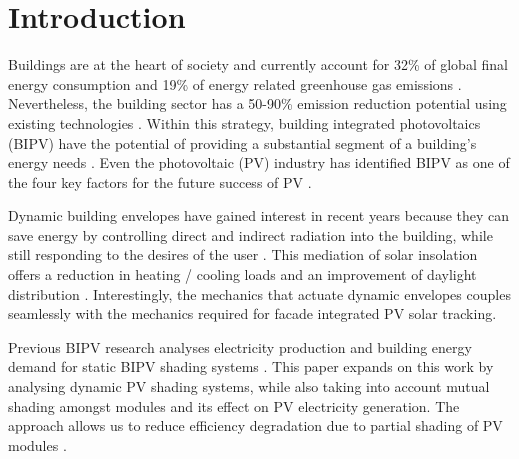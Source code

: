 \chapter{Introduction}

Buildings are at the heart of society and currently account for 32\% of global final energy consumption and 19\% of energy related greenhouse gas emissions \cite{IPCC}. Nevertheless, the building sector has a 50-90\% emission reduction potential using existing technologies \cite{IPCC}. Within this strategy, building integrated photovoltaics (BIPV) have the potential of providing a substantial segment of a building's energy needs \cite{defaix2012technical}. Even the photovoltaic (PV) industry has identified BIPV as one of the four key factors for the future success of PV \cite{raugei2009life}. 



Dynamic building envelopes have gained interest in recent years because they can save energy by controlling direct and indirect radiation into the building, while still responding to the desires of the user \cite{loonen2013climate}. This mediation of solar insolation offers a reduction in heating / cooling loads and an improvement of daylight distribution \cite{rossi2012adaptive}. Interestingly, the mechanics that actuate dynamic envelopes couples seamlessly with the mechanics required for facade integrated PV solar tracking. 

Previous BIPV research analyses electricity production and building energy demand for static BIPV shading systems \cite{mandalaki2012assessment} \cite{yoo2011available} \cite{freitas2015maximizing} \cite{jayathissa2015abs}. This paper expands on this work by analysing dynamic PV shading systems, while also taking into account mutual shading amongst modules and its effect on PV electricity generation. The approach allows us to reduce efficiency degradation due to partial shading of PV modules \cite{hofer2015PVSEC}.%


